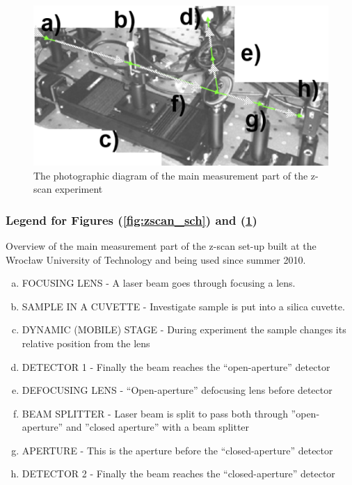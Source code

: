 \documentclass[12pt,twoside,a4paper]{article}
\numberwithin{equation}{subsection}
\numberwithin{figure}{subsection}
\begin{document}
\begin{figure}
 \includegraphics{img/zscan_diag.png}
 \caption{The photographic diagram of the main measurement part of the z-scan experiment 
 \label{fig:zscan_diag}}
\end{figure}

\subsubsection*{Legend for Figures (\ref{fig:zscan_sch}) and (\ref{fig:zscan_diag})} 

Overview of the main measurement part of the z-scan set-up built at the Wrocław University of Technology and being used since summer 2010.
 
\begin{enumerate}[(a)]
  \item FOCUSING LENS - A laser beam goes through focusing a lens.
  \item SAMPLE IN A CUVETTE - Investigate sample is put into a silica cuvette.
  \item DYNAMIC (MOBILE) STAGE - During experiment the sample changes its relative position from the lens
  \item DETECTOR 1 - Finally the beam reaches the ``open-aperture'' detector  
  \item DEFOCUSING LENS  - ``Open-aperture'' defocusing lens before detector
  \item BEAM SPLITTER - Laser beam is split to pass both through ''open-aperture'' and ''closed aperture'' with a beam splitter
  \item APERTURE - This is the aperture before the ``closed-aperture'' detector
  \item DETECTOR 2 - Finally the beam reaches the ``closed-aperture'' detector
\end{enumerate}
\end{document}
